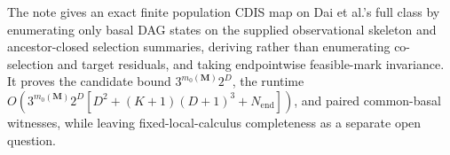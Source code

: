 The note gives an exact finite population CDIS map on Dai et al.'s full class by enumerating only basal DAG states on the supplied observational skeleton and ancestor-closed selection summaries, deriving rather than enumerating co-selection and target residuals, and taking endpointwise feasible-mark invariance.  It proves the candidate bound \(3^{m_0(\mathbf M)}2^D\), the runtime \(O(3^{m_0(\mathbf M)}2^D[D^2+(K+1)(D+1)^3+N_{\mathrm{end}}])\), and paired common-basal witnesses, while leaving fixed-local-calculus completeness as a separate open question.